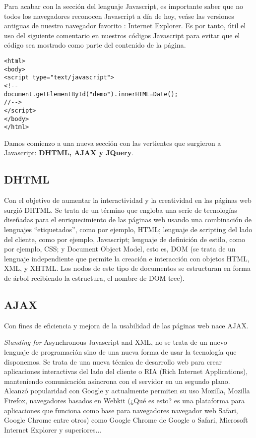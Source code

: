 \documentclass{apuntes}
\begin{document}
Para acabar con la sección del lenguaje Javascript, es importante saber que no todos los navegadores reconocen Javascript a día de hoy, veáse las versiones antiguas de nuestro navegador favorito : Internet Explorer. Es por tanto, útil el uso del siguiente comentario en nuestros códigos Javascript para evitar que el código sea mostrado como parte del contenido de la página.

\begin{verbatim}
<html>
<body>
<script type="text/javascript">
<!--
document.getElementById("demo").innerHTML=Date();
//-->
</script>
</body>
</html>
\end{verbatim}

Damos comienzo a una nueva sección con las vertientes que surgieron a Javascript: \textbf{DHTML, AJAX y JQuery}. 

\subsection{DHTML }
Con el objetivo de aumentar la interactividad y la creatividad en las páginas web surgió DHTML. Se trata de un término que engloba una serie de tecnologías diseñadas para el enriquecimiento de las páginas web usando una combinación de lenguajes “etiquetados”, como por ejemplo, HTML; lenguaje de scripting del lado del cliente, como por ejemplo, Javascript; lenguaje de definición de estilo, como por ejemplo, CSS; y Document Object Model, esto es, DOM (se trata de un lenguaje independiente que permite la creación e interacción con objetos  HTML, XML, y  XHTML. Los nodos de este tipo de documentos se estructuran en forma de árbol recibiendo la estructura,  el nombre de DOM tree).


\subsection{AJAX}
Con fines de eficiencia y mejora de la usabilidad de las páginas web nace AJAX. 

\emph{Standing for} Asynchronous Javascript and XML, no se trata de un nuevo lenguaje de programación sino de una nueva forma de usar  la tecnología que disponemos. Se trata de una nueva técnica de desarrollo web para crear aplicaciones interactivas del lado del cliente o RIA (Rich Internet Applications), manteniendo comunicación asíncrona con el servidor en un segundo plano. Alcanzó popularidad con Google y actualmente permiten su uso Mozilla, Mozilla Firefox, navegadores basados en Webkit (¿Qué es esto? es una plataforma para aplicaciones que funciona como base para navegadores  navegador web Safari, Google Chrome entre otros) como Google Chrome de Google o Safari, Microsoft Internet Explorer  y superiores...
\end{document}
